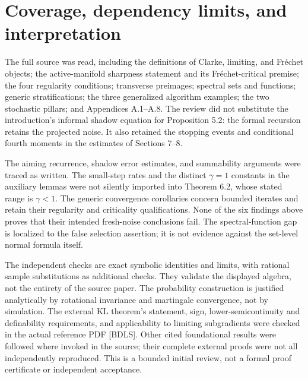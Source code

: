 \documentclass[10pt]{article}
\begin{document}
\section*{Coverage, dependency limits, and interpretation}
The full source was read, including the definitions of Clarke, limiting, and Fréchet objects; the active-manifold sharpness statement and its Fréchet-critical premise; the four regularity conditions; transverse preimages; spectral sets and functions; generic stratifications; the three generalized algorithm examples; the two stochastic pillars; and Appendices A.1–A.8. The review did not substitute the introduction’s informal shadow equation for Proposition 5.2: the formal recursion retains the projected noise. It also retained the stopping events and conditional fourth moments in the estimates of Sections 7–8.\par
The aiming recurrence, shadow error estimates, and summability arguments were traced as written. The small-step rates and the distinct \(\gamma=1\) constants in the auxiliary lemmas were not silently imported into Theorem 6.2, whose stated range is \(\gamma<1\). The generic convergence corollaries concern bounded iterates and retain their regularity and criticality qualifications. None of the six findings above proves that their intended fresh-noise conclusions fail. The spectral-function gap is localized to the false selection assertion; it is not evidence against the set-level normal formula itself.\par
The independent checks are exact symbolic identities and limits, with rational sample substitutions as additional checks. They validate the displayed algebra, not the entirety of the source paper. The probability construction is justified analytically by rotational invariance and martingale convergence, not by simulation. The external KL theorem’s statement, sign, lower-semicontinuity and definability requirements, and applicability to limiting subgradients were checked in the actual reference PDF [BDLS]. Other cited foundational results were followed where invoked in the source; their complete external proofs were not all independently reproduced. This is a bounded initial review, not a formal proof certificate or independent acceptance.\par
\end{document}
